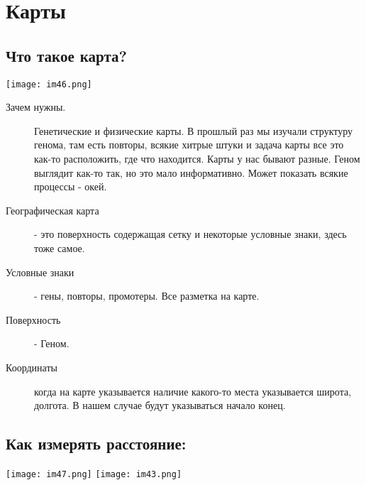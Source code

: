 ﻿\section{Карты}
\subsection{Что такое карта?}
\texttt{[image: im46.png]}
\begin{description}
\item[Зачем нужны.]
Генетические и физические карты. В прошлый 
раз мы изучали структуру 
генома, там есть повторы, всякие хитрые штуки и 
задача карты все это как-то расположить, где что находится. 
Карты у нас бывают разные. 
Геном выглядит как-то так, но это мало информативно. Может 
показать всякие процессы - окей. 

\item[Географическая карта] - это 
поверхность содержащая сетку и некоторые условные знаки, 
здесь тоже самое. 

\item[Условные знаки] - гены, повторы, промотеры. Все разметка на 
карте. 

\item[Поверхность]- Геном. 

\item[Координаты] когда на карте указывается наличие какого-то места указывается 
широта, долгота. В нашем случае будут указываться начало конец. 
\end{description} 

\subsection{Как измерять расстояние:}
\texttt{[image: im47.png]}
\texttt{[image: im43.png]}

